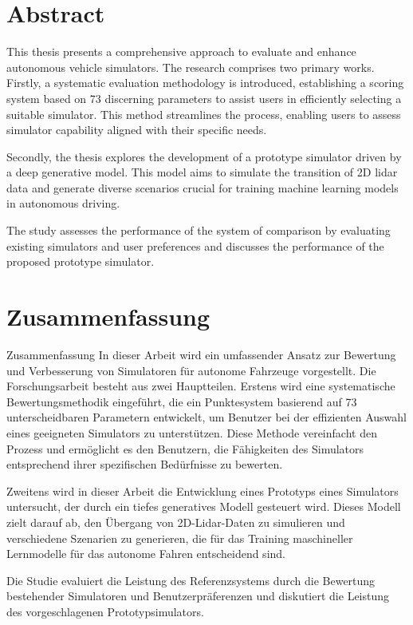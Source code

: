 \documentclass[12pt,twoside,a4paper,parskip]{scrbook} %
\begin{document}

\section*{Abstract}
This thesis presents a comprehensive approach to evaluate and enhance autonomous vehicle simulators. The research comprises two primary works. Firstly, a systematic evaluation methodology is introduced, establishing a scoring system based on 73 discerning parameters to assist users in efficiently selecting a suitable simulator. This method streamlines the process, enabling users to assess simulator capability aligned with their specific needs.

Secondly, the thesis explores the development of a prototype simulator driven by a deep generative model. This model aims to simulate the transition of 2D lidar data and generate diverse scenarios crucial for training machine learning models in autonomous driving. 

The study assesses the performance of the system of comparison by evaluating existing simulators and user preferences and discusses the performance of the proposed prototype simulator.


\section*{Zusammenfassung}
Zusammenfassung
In dieser Arbeit wird ein umfassender Ansatz zur Bewertung und Verbesserung von Simulatoren für autonome Fahrzeuge vorgestellt. Die Forschungsarbeit besteht aus zwei Hauptteilen. Erstens wird eine systematische Bewertungsmethodik eingeführt, die ein Punktesystem basierend auf 73 unterscheidbaren Parametern entwickelt, um Benutzer bei der effizienten Auswahl eines geeigneten Simulators zu unterstützen. Diese Methode vereinfacht den Prozess und ermöglicht es den Benutzern, die Fähigkeiten des Simulators entsprechend ihrer spezifischen Bedürfnisse zu bewerten.

Zweitens wird in dieser Arbeit die Entwicklung eines Prototyps eines Simulators untersucht, der durch ein tiefes generatives Modell gesteuert wird. Dieses Modell zielt darauf ab, den Übergang von 2D-Lidar-Daten zu simulieren und verschiedene Szenarien zu generieren, die für das Training maschineller Lernmodelle für das autonome Fahren entscheidend sind. 

Die Studie evaluiert die Leistung des Referenzsystems durch die Bewertung bestehender Simulatoren und Benutzerpräferenzen und diskutiert die Leistung des vorgeschlagenen Prototypsimulators.
\end{document}

